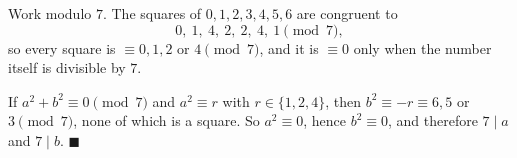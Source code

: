 Work modulo $7$. The squares of $0,1,2,3,4,5,6$ are congruent to
\[
0,\ 1,\ 4,\ 2,\ 2,\ 4,\ 1\pmod 7,
\]
so every square is $\equiv0,1,2$ or $4\pmod7$, and it is $\equiv0$ only when the number itself is divisible by $7$.

If $a^2+b^2\equiv0\pmod7$ and $a^2\equiv r$ with $r\in\{1,2,4\}$, then $b^2\equiv-r\equiv6,5$ or $3\pmod7$, none of which is a square. So $a^2\equiv0$, hence $b^2\equiv0$, and therefore $7\mid a$ and $7\mid b$. $\blacksquare$
